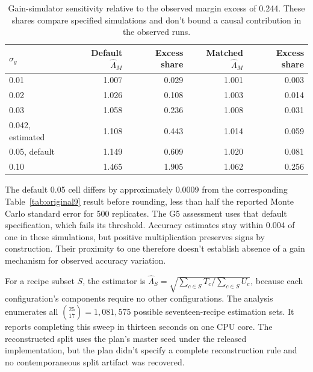 \begin{table}[htbp]
\centering\small
\caption{Gain-simulator sensitivity relative to the observed margin excess of 0.244. These shares compare specified simulations and don't bound a causal contribution in the observed runs.}
\label{tab:original13}
\begin{tabular}{lrrrr}\hline
$\sigma_g$ & Default $\widehat\Lambda_M$ & Excess share & Matched $\widehat\Lambda_M$ & Excess share\\\hline
0.01 & 1.007 & 0.029 & 1.001 & 0.003\\
0.02 & 1.026 & 0.108 & 1.003 & 0.014\\
0.03 & 1.058 & 0.236 & 1.008 & 0.031\\
0.042, estimated & 1.108 & 0.443 & 1.014 & 0.059\\
0.05, default & 1.149 & 0.609 & 1.020 & 0.081\\
0.10 & 1.465 & 1.905 & 1.062 & 0.256\\\hline
\end{tabular}
\end{table}

The default 0.05 cell differs by approximately 0.0009 from the corresponding Table~\ref{tab:original9} result before rounding, less than half the reported Monte Carlo standard error for 500 replicates. The G5 assessment uses that default specification, which fails its threshold. Accuracy estimates stay within 0.004 of one in these simulations, but positive multiplication preserves signs by construction. Their proximity to one therefore doesn't establish absence of a gain mechanism for observed accuracy variation.

For a recipe subset $S$, the estimator is $\widehat\Lambda_S=\sqrt{\sum_{c\in S}T_c/\sum_{c\in S}U_c}$, because each configuration's components require no other configurations. The analysis enumerates all $\binom{25}{17}=1{,}081{,}575$ possible seventeen-recipe estimation sets. It reports completing this sweep in thirteen seconds on one CPU core. The reconstructed split uses the plan's master seed under the released implementation, but the plan didn't specify a complete reconstruction rule and no contemporaneous split artifact was recovered.

